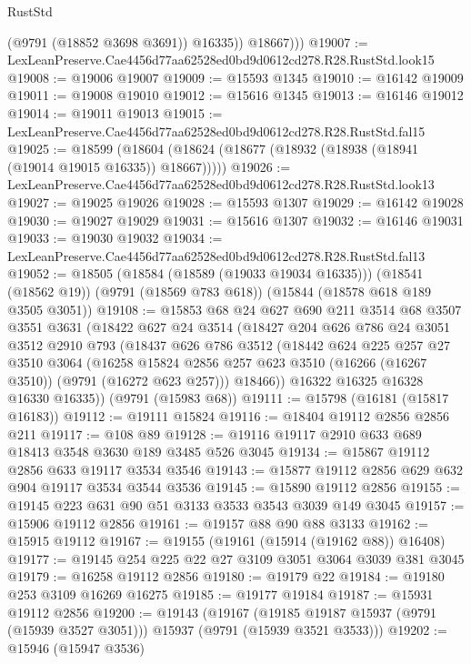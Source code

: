 \begin{lexlean}{RustStd}
\begin{coremodule}
              (@9791 (@18852 @3698 @3691))
              @16335))
          @18667)))
@19007 := LexLeanPreserve.Cae4456d77aa62528ed0bd9d0612cd278.R28.RustStd.look15
@19008 := @19006 @19007
@19009 := @15593 @1345
@19010 := @16142 @19009
@19011 := @19008 @19010
@19012 := @15616 @1345
@19013 := @16146 @19012
@19014 := @19011 @19013
@19015 := LexLeanPreserve.Cae4456d77aa62528ed0bd9d0612cd278.R28.RustStd.fal15
@19025 := @18599 (@18604 (@18624 (@18677 (@18932 (@18938 (@18941 (@19014 @19015 @16335)) @18667)))))
@19026 := LexLeanPreserve.Cae4456d77aa62528ed0bd9d0612cd278.R28.RustStd.look13
@19027 := @19025 @19026
@19028 := @15593 @1307
@19029 := @16142 @19028
@19030 := @19027 @19029
@19031 := @15616 @1307
@19032 := @16146 @19031
@19033 := @19030 @19032
@19034 := LexLeanPreserve.Cae4456d77aa62528ed0bd9d0612cd278.R28.RustStd.fal13
@19052 := @18505
    (@18584 (@18589 (@19033 @19034 @16335)))
    (@18541 (@18562 @19))
    (@9791 (@18569 @783 @618))
    (@15844 (@18578 @618 @189 @3505 @3051))
@19108 := @15853
    @68
    @24
    @627
    @690
    @211
    @3514
    @68
    @3507
    @3551
    @3631
    (@18422
      @627
      @24
      @3514
      (@18427
        @204
        @626
        @786
        @24
        @3051
        @3512
        @2910
        @793
        (@18437
          @626
          @786
          @3512
          (@18442
            @624
            @225
            @257
            @27
            @3510
            @3064
            (@16258 @15824 @2856 @257 @623 @3510 (@16266 (@16267 @3510)) (@9791 (@16272 @623 @257)))
            @18466))
        @16322
        @16325
        @16328
        @16330
        @16335))
    (@9791 (@15983 @68))
@19111 := @15798 (@16181 (@15817 @16183))
@19112 := @19111 @15824
@19116 := @18404 @19112 @2856 @2856 @211
@19117 := @108 @89
@19128 := @19116 @19117 @2910 @633 @689 @18413 @3548 @3630 @189 @3485 @526 @3045
@19134 := @15867 @19112 @2856 @633 @19117 @3534 @3546
@19143 := @15877 @19112 @2856 @629 @632 @904 @19117 @3534 @3544 @3536
@19145 := @15890 @19112 @2856
@19155 := @19145 @223 @631 @90 @51 @3133 @3533 @3543 @3039 @149 @3045
@19157 := @15906 @19112 @2856
@19161 := @19157 @88 @90 @88 @3133
@19162 := @15915 @19112
@19167 := @19155 (@19161 (@15914 (@19162 @88)) @16408)
@19177 := @19145 @254 @225 @22 @27 @3109 @3051 @3064 @3039 @381 @3045
@19179 := @16258 @19112 @2856
@19180 := @19179 @22
@19184 := @19180 @253 @3109 @16269 @16275
@19185 := @19177 @19184
@19187 := @15931 @19112 @2856
@19200 := @19143
    (@19167 (@19185 @19187 @15937 (@9791 (@15939 @3527 @3051))) @15937 (@9791 (@15939 @3521 @3533)))
@19202 := @15946 (@15947 @3536)

\end{coremodule}
\end{lexlean}
